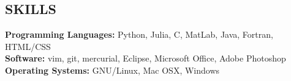 \documentclass[margin]{res}
\begin{document}
\begin{resume}
\section{SKILLS}
\textbf{Programming Languages:} Python, Julia, C, MatLab, Java, Fortran, HTML/CSS \\
\textbf{Software:} vim, git, mercurial, Eclipse, Microsoft Office, Adobe Photoshop \\
\textbf{Operating Systems:} GNU/Linux, Mac OSX, Windows
                 

\end{resume}
\end{document}
